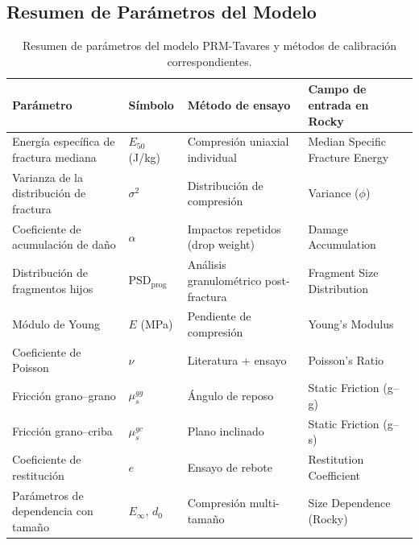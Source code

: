 \documentclass[conference]{IEEEtran}
\begin{document}
\subsection{Resumen de Parámetros del Modelo}
\begin{table}[t]
\centering
\caption{Resumen de parámetros del modelo PRM-Tavares y métodos de calibración correspondientes.}
\label{tab:params}
\renewcommand{\arraystretch}{1.2}
\begin{tabular}{L{4.4cm} C{1.8cm} L{3.5cm} L{5.0cm}}
\toprule
\textbf{Parámetro} & \textbf{Símbolo} & \textbf{Método de ensayo} & \textbf{Campo de entrada en Rocky} \\
\midrule
Energía específica de fractura mediana & $E_{50}$ (J/kg) & Compresión uniaxial individual & Median Specific Fracture Energy \\
Varianza de la distribución de fractura & $\sigma^{2}$ & Distribución de compresión & Variance ($\phi$) \\
Coeficiente de acumulación de daño & $\alpha$ & Impactos repetidos (drop weight) & Damage Accumulation \\
Distribución de fragmentos hijos & PSD$_{\text{prog}}$ & Análisis granulométrico post-fractura & Fragment Size Distribution \\
Módulo de Young & $E$ (MPa) & Pendiente de compresión & Young's Modulus \\
Coeficiente de Poisson & $\nu$ & Literatura + ensayo & Poisson's Ratio \\
Fricción grano--grano & $\mu_{s}^{gg}$ & Ángulo de reposo & Static Friction (g--g) \\
Fricción grano--criba & $\mu_{s}^{gc}$ & Plano inclinado & Static Friction (g--s) \\
Coeficiente de restitución & $e$ & Ensayo de rebote & Restitution Coefficient \\
Parámetros de dependencia con tamaño & $E_{\infty},\,d_{0}$ & Compresión multi-tamaño & Size Dependence (Rocky) \\
\bottomrule
\end{tabular}
\end{table}

\end{document}
